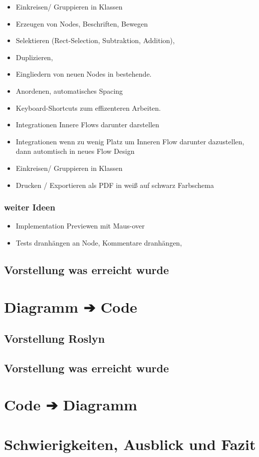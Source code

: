 \documentclass[11pt]{article}
\begin{document}
\begin{itemize}
\item Einkreisen/ Gruppieren in Klassen
\item Erzeugen von Nodes, Beschriften, Bewegen
\item Selektieren (Rect-Selection, Subtraktion, Addition),
\item Duplizieren,
\item Eingliedern von neuen Nodes in bestehende.
\item Anordenen, automatisches Spacing
\item Keyboard-Shortcuts zum effizenteren Arbeiten.
\item Integrationen Innere Flows darunter darstellen
\item Integrationen wenn zu wenig Platz um Inneren Flow darunter dazustellen, dann automtisch in neues Flow Design
\item Einkreisen/ Gruppieren in Klassen
\item Drucken / Exportieren als PDF in weiß auf schwarz Farbschema
\end{itemize}

\subsubsection{weiter Ideen}
\label{sec:orgheadline5}
\begin{itemize}
\item Implementation Previewen mit Maus-over
\item Tests dranhängen an Node, Kommentare dranhängen,
\end{itemize}
\subsection{Vorstellung was erreicht wurde}
\label{sec:orgheadline7}
\section{Diagramm ➔ Code}
\label{sec:orgheadline11}
\subsection{Vorstellung Roslyn}
\label{sec:orgheadline9}
\subsection{Vorstellung was erreicht wurde}
\label{sec:orgheadline10}
\section{Code ➔ Diagramm}
\label{sec:orgheadline12}
\section{Schwierigkeiten, Ausblick und Fazit}
\label{sec:orgheadline13}
\end{document}
